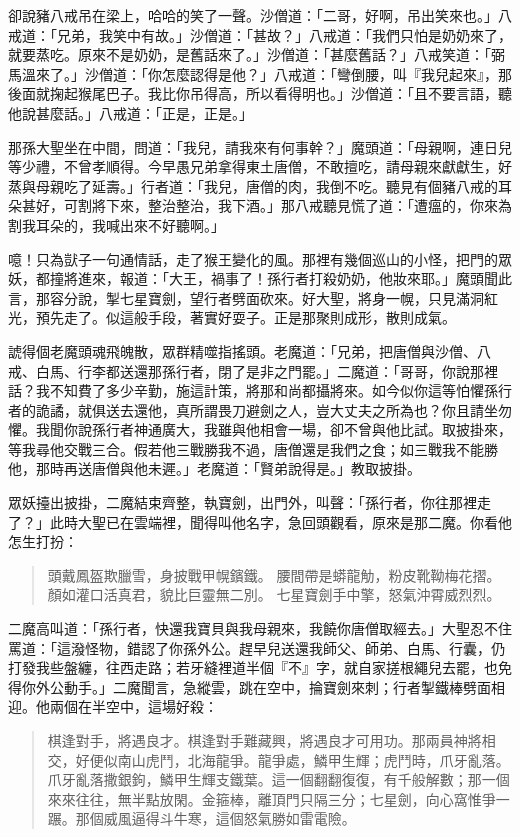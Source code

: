 卻說豬八戒吊在梁上，哈哈的笑了一聲。沙僧道：「二哥，好啊，吊出笑來也。」八戒道：「兄弟，我笑中有故。」沙僧道：「甚故？」八戒道：「我們只怕是奶奶來了，就要蒸吃。原來不是奶奶，是舊話來了。」沙僧道：「甚麼舊話？」八戒笑道：「弼馬溫來了。」沙僧道：「你怎麼認得是他？」八戒道：「彎倒腰，叫『我兒起來』，那後面就掬起猴尾巴子。我比你吊得高，所以看得明也。」沙僧道：「且不要言語，聽他說甚麼話。」八戒道：「正是，正是。」

那孫大聖坐在中間，問道：「我兒，請我來有何事幹？」魔頭道：「母親啊，連日兒等少禮，不曾孝順得。今早愚兄弟拿得東土唐僧，不敢擅吃，請母親來獻獻生，好蒸與母親吃了延壽。」行者道：「我兒，唐僧的肉，我倒不吃。聽見有個豬八戒的耳朵甚好，可割將下來，整治整治，我下酒。」那八戒聽見慌了道：「遭瘟的，你來為割我耳朵的，我喊出來不好聽啊。」

噫！只為獃子一句通情話，走了猴王變化的風。那裡有幾個巡山的小怪，把門的眾妖，都撞將進來，報道：「大王，禍事了！孫行者打殺奶奶，他妝來耶。」魔頭聞此言，那容分說，掣七星寶劍，望行者劈面砍來。好大聖，將身一幌，只見滿洞紅光，預先走了。似這般手段，著實好耍子。正是那聚則成形，散則成氣。

諕得個老魔頭魂飛魄散，眾群精噬指搖頭。老魔道：「兄弟，把唐僧與沙僧、八戒、白馬、行李都送還那孫行者，閉了是非之門罷。」二魔道：「哥哥，你說那裡話？我不知費了多少辛勤，施這計策，將那和尚都攝將來。如今似你這等怕懼孫行者的詭譎，就俱送去還他，真所謂畏刀避劍之人，豈大丈夫之所為也？你且請坐勿懼。我聞你說孫行者神通廣大，我雖與他相會一場，卻不曾與他比試。取披掛來，等我尋他交戰三合。假若他三戰勝我不過，唐僧還是我們之食；如三戰我不能勝他，那時再送唐僧與他未遲。」老魔道：「賢弟說得是。」教取披掛。

眾妖擡出披掛，二魔結束齊整，執寶劍，出門外，叫聲：「孫行者，你往那裡走了？」此時大聖已在雲端裡，聞得叫他名字，急回頭觀看，原來是那二魔。你看他怎生打扮：
\begin{quote}
頭戴鳳盔欺臘雪，身披戰甲幌鑌鐵。
腰間帶是蟒龍觔，粉皮靴靿梅花摺。
顏如灌口活真君，貌比巨靈無二別。
七星寶劍手中擎，怒氣沖霄威烈烈。
\end{quote}

二魔高叫道：「孫行者，快還我寶貝與我母親來，我饒你唐僧取經去。」大聖忍不住罵道：「這潑怪物，錯認了你孫外公。趕早兒送還我師父、師弟、白馬、行囊，仍打發我些盤纏，往西走路；若牙縫裡道半個『不』字，就自家搓根繩兒去罷，也免得你外公動手。」二魔聞言，急縱雲，跳在空中，掄寶劍來刺；行者掣鐵棒劈面相迎。他兩個在半空中，這場好殺：
\begin{quote}
棋逢對手，將遇良才。棋逢對手難藏興，將遇良才可用功。那兩員神將相交，好便似南山虎鬥，北海龍爭。龍爭處，鱗甲生輝；虎鬥時，爪牙亂落。爪牙亂落撒銀鉤，鱗甲生輝支鐵葉。這一個翻翻復復，有千般解數；那一個來來往往，無半點放閑。金箍棒，離頂門只隔三分；七星劍，向心窩惟爭一蹍。那個威風逼得斗牛寒，這個怒氣勝如雷電險。
\end{quote}

